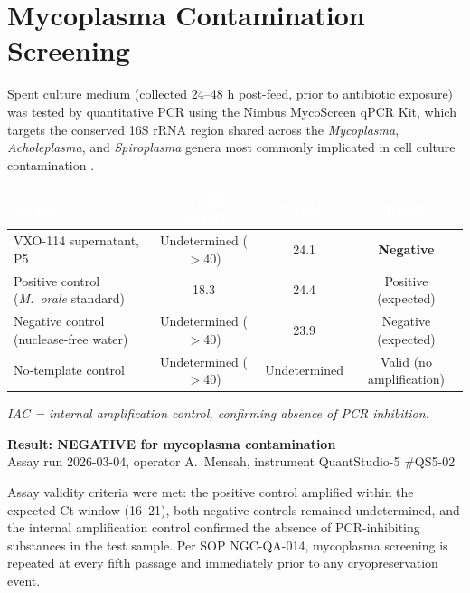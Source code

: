 
\section{Mycoplasma Contamination Screening}

Spent culture medium (collected 24--48 h post-feed, prior to antibiotic exposure) was tested
by quantitative PCR using the Nimbus MycoScreen qPCR Kit, which targets the conserved 16S
rRNA region shared across the \textit{Mycoplasma}, \textit{Acholeplasma}, and
\textit{Spiroplasma} genera most commonly implicated in cell culture contamination
\cite{uphoff_drexler_2011}.

\begin{table}[h!]
  \centering
  \renewcommand{\arraystretch}{1.3}
  \begin{tabularx}{\textwidth}{@{} X c c c @{}}
    \toprule
    \rowcolor{labnavy}
    \textcolor{white}{\textbf{Sample}} & \textcolor{white}{\textbf{Ct (16S target)}} &
    \textcolor{white}{\textbf{Ct (IAC)}} & \textcolor{white}{\textbf{Result}} \\
    \midrule
    VXO-114 supernatant, P5 & Undetermined ($>$40) & 24.1 & \textbf{\color{labgreen}Negative} \\
    Positive control (\textit{M.\ orale} standard) & 18.3 & 24.4 & Positive (expected) \\
    Negative control (nuclease-free water) & Undetermined ($>$40) & 23.9 & Negative (expected) \\
    No-template control & Undetermined ($>$40) & Undetermined & Valid (no amplification) \\
    \bottomrule
  \end{tabularx}
\end{table}

\textit{IAC = internal amplification control, confirming absence of PCR inhibition.}

\begin{center}
\begin{minipage}{0.7\textwidth}
  \begin{tcolorbox}[colback=labgreen!10, colframe=labgreen, arc=2pt, boxrule=0.8pt]
    \centering \textbf{Result: NEGATIVE for mycoplasma contamination}\\
    \footnotesize Assay run 2026-03-04, operator A.\ Mensah, instrument QuantStudio-5 \#QS5-02
  \end{tcolorbox}
\end{minipage}
\end{center}

Assay validity criteria were met: the positive control amplified within the expected Ct
window (16--21), both negative controls remained undetermined, and the internal
amplification control confirmed the absence of PCR-inhibiting substances in the test
sample. Per SOP NGC-QA-014, mycoplasma screening is repeated at every fifth passage and
immediately prior to any cryopreservation event.

